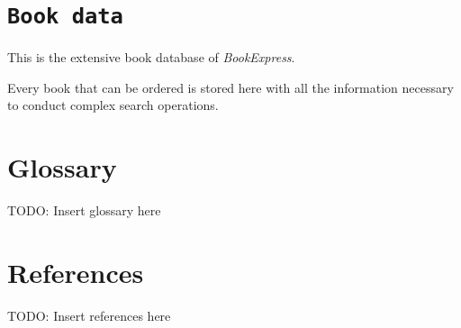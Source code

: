\section{\texttt{Book data}}
This is the extensive book database of \emph{BookExpress}.

Every book that can be ordered is stored here with all the information necessary to conduct complex search operations.


\newpage
\begin{appendix}
\section{Glossary}
TODO: Insert glossary here
\section{References}
TODO: Insert references here
\end{appendix}



